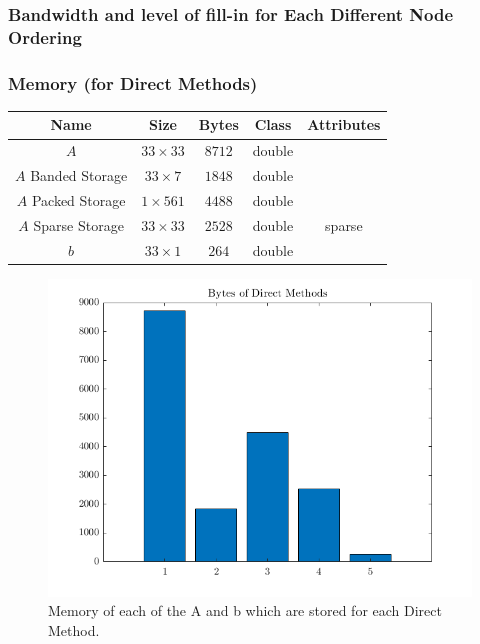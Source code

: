 \documentclass[12pt,a4paper]{article}
\begin{document}
\subsubsection{Bandwidth and level of fill-in for Each Different Node Ordering}


\subsubsection{Memory (for Direct Methods)}
\begin{center}
\begin{tabular}{c c c c c}
Name & Size & Bytes & Class & Attributes \\
\hline
$A$ & $33 \times 33$ & $8712$ & double & \\
$A$ Banded Storage & $33 \times 7$ & $1848$ & double & \\
$A$ Packed Storage & $1 \times 561$ & $4488$ & double & \\
$A$ Sparse Storage & $33 \times 33$ & $2528$ & double & sparse \\
$b$ & $33 \times 1$ & $264$ & double & \\
\end{tabular}
\end{center}

\begin{figure}[H]
	\includegraphics[width=\linewidth]{images/MemoryGraph.png}
	\caption{Memory of each of the A and b which are stored for each Direct Method.}
	\label{fig:memory}
\end{figure}
\end{document}

